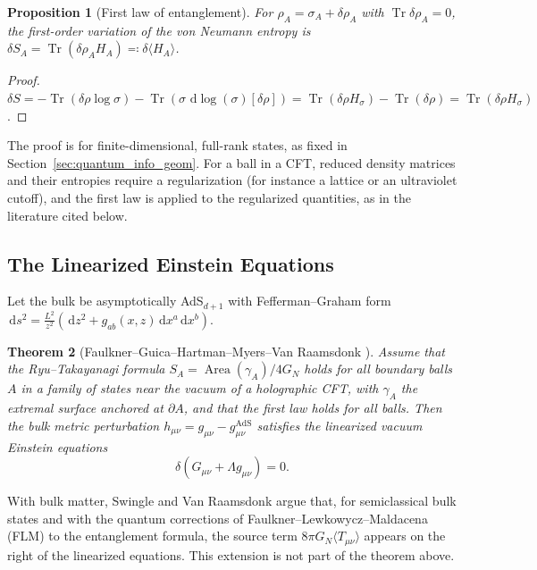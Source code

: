 \documentclass[11pt,a4paper,reqno]{amsart}
\newtheorem{theorem}{Theorem}[section]
\newtheorem{proposition}[theorem]{Proposition}
\theoremstyle{definition}
\numberwithin{equation}{section}
\newcommand{\Tr}{\operatorname{Tr}}
\providecommand{\Area}{\operatorname{Area}}
\newcommand{\dif}{\,\mathrm{d}}
\begin{document}
\begin{proposition}[First law of entanglement]
\label{thm:first_law_entanglement}
For $\rho_A = \sigma_A + \delta \rho_A$ with $\Tr\delta\rho_A = 0$, the first-order variation of the von Neumann entropy is $\delta S_A = \Tr(\delta \rho_A H_A) \eqqcolon \delta\langle H_A\rangle$.
\end{proposition}
\begin{proof}
$\delta S = -\Tr(\delta \rho \log \sigma) - \Tr(\sigma\,\dif\log(\sigma)[\delta\rho]) = \Tr(\delta \rho H_\sigma) - \Tr(\delta \rho) = \Tr(\delta\rho H_\sigma)$.
\end{proof}

The proof is for finite-dimensional, full-rank states, as fixed in Section~\ref{sec:quantum_info_geom}. For a ball in a CFT, reduced density matrices and their entropies require a regularization (for instance a lattice or an ultraviolet cutoff), and the first law is applied to the regularized quantities, as in the literature cited below.

\subsection{The Linearized Einstein Equations}
Let the bulk be asymptotically AdS$_{d+1}$ with Fefferman--Graham form $\dif s^2 = \frac{L^2}{z^2}\left( \dif z^2 + g_{ab}(x, z) \dif x^a \dif x^b \right)$.

\begin{theorem}[Faulkner--Guica--Hartman--Myers--Van Raamsdonk \cite{faulkner2014gravitation}]
\label{thm:einstein_emergence}
Assume that the Ryu--Takayanagi formula $S_A = \Area(\gamma_A)/4G_N$ holds for all boundary balls $A$ in a family of states near the vacuum of a holographic CFT, with $\gamma_A$ the extremal surface anchored at $\partial A$, and that the first law holds for all balls. Then the bulk metric perturbation $h_{\mu\nu} = g_{\mu\nu} - g^{\mathrm{AdS}}_{\mu\nu}$ satisfies the \emph{linearized} vacuum Einstein equations
\begin{equation}
    \label{eq:einstein_emergent}
    \delta\!\left(G_{\mu\nu} + \Lambda g_{\mu\nu}\right) = 0.
\end{equation}
\end{theorem}

With bulk matter, Swingle and Van Raamsdonk \cite{swingle2014universality} argue that, for semiclassical bulk states and with the quantum corrections of Faulkner--Lewkowycz--Maldacena (FLM) \cite{faulkner2013quantum} to the entanglement formula, the source term $8\pi G_N\langle T_{\mu\nu}\rangle$ appears on the right of the linearized equations. This extension is not part of the theorem above.
\end{document}

